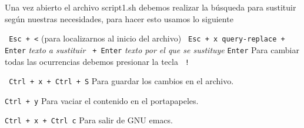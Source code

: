 \documentclass[12pt]{article}
\begin{document}
Una vez abierto el archivo script1.sh debemos realizar la búsqueda para sustituir según nuestras necesidades, para hacer esto usamos lo siguiente

\verb# Esc + <# (para localizarnos al inicio del archivo) \hfill \break
\verb# Esc + x query-replace + Enter# \textit{texto a sustituir} \verb# + Enter# \textit{texto por el que se sustituye} \verb#Enter#  \hfill \break
Para cambiar todas las ocurrencias debemos presionar la tecla \verb# ! # 

\verb# Ctrl + x + Ctrl + S# \hspace{1 cm} Para guardar los cambios en el archivo.

\verb#Ctrl + y# \hspace{1 cm} Para vaciar el contenido en el portapapeles.

\verb#Ctrl + x + Ctrl c# \hspace{1 cm} Para salir de GNU emacs.
\end{document}
